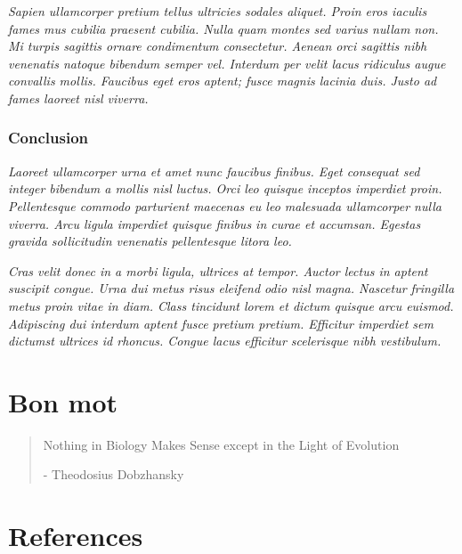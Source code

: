 \documentclass[
  a4paper,
]{scrbook}
\begin{document}
\emph{Sapien ullamcorper pretium tellus ultricies sodales aliquet. Proin
eros iaculis fames mus cubilia praesent cubilia. Nulla quam montes sed
varius nullam non. Mi turpis sagittis ornare condimentum consectetur.
Aenean orci sagittis nibh venenatis natoque bibendum semper vel.
Interdum per velit lacus ridiculus augue convallis mollis. Faucibus eget
eros aptent; fusce magnis lacinia duis. Justo ad fames laoreet nisl
viverra.}

\subsection{Conclusion}\label{conclusion}

\emph{Laoreet ullamcorper urna et amet nunc faucibus finibus. Eget
consequat sed integer bibendum a mollis nisl luctus. Orci leo quisque
inceptos imperdiet proin. Pellentesque commodo parturient maecenas eu
leo malesuada ullamcorper nulla viverra. Arcu ligula imperdiet quisque
finibus in curae et accumsan. Egestas gravida sollicitudin venenatis
pellentesque litora leo.}

\emph{Cras velit donec in a morbi ligula, ultrices at tempor. Auctor
lectus in aptent suscipit congue. Urna dui metus risus eleifend odio
nisl magna. Nascetur fringilla metus proin vitae in diam. Class
tincidunt lorem et dictum quisque arcu euismod. Adipiscing dui interdum
aptent fusce pretium pretium. Efficitur imperdiet sem dictumst ultrices
id rhoncus. Congue lacus efficitur scelerisque nibh vestibulum.}

\chapter{Bon mot}\label{bon-mot}

\begin{quote}
Nothing in Biology Makes Sense except in the Light of Evolution

- Theodosius Dobzhansky
\end{quote}

\chapter{References}\label{references}
\end{document}

